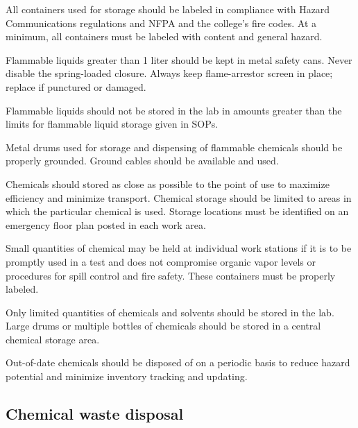 \documentclass[12pt]{../SOP2}
\begin{document}
All containers used for storage should be labeled in compliance with Hazard Communications regulations and NFPA and the college’s fire codes. At a minimum, all containers must be labeled with content and general hazard.

Flammable liquids greater than 1 liter should be kept in metal safety cans. Never disable the spring-loaded closure. Always keep flame-arrestor screen in place; replace if punctured or damaged. 

Flammable liquids should not be stored in the lab in amounts greater than the limits for flammable liquid storage given in SOPs. 

Metal drums used for storage and dispensing of flammable chemicals should be properly grounded. Ground cables should be available and used.

Chemicals should stored as close as possible to the point of use to maximize efficiency and minimize transport. Chemical storage should be limited to areas in which the particular chemical is used. Storage locations must be identified on an emergency floor plan posted in each work area.

Small quantities of chemical may be held at individual work stations if it is to be promptly used in a test and does not compromise organic vapor levels or procedures for spill control and fire safety. These containers must be properly labeled.

Only limited quantities of chemicals and solvents should be stored in the lab. Large drums or multiple bottles of chemicals should be stored in a central chemical storage area.

Out-of-date chemicals should be disposed of on a periodic basis to reduce hazard potential and minimize inventory tracking and updating.

\subsection{Chemical waste disposal}
\end{document}
